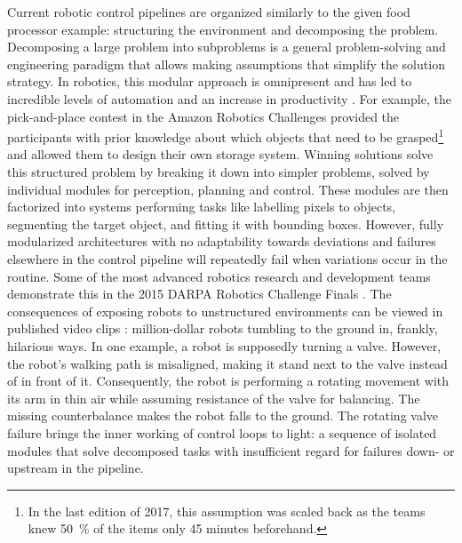 \documentclass[\home/main.tex]{subfiles}
\begin{document}
Current robotic control pipelines are organized similarly to the given food processor example: structuring the environment and decomposing the problem. Decomposing a large problem into subproblems is a general problem-solving and engineering paradigm that allows making assumptions that simplify the solution strategy.
In robotics, this modular approach is omnipresent and has led to incredible levels of automation and an increase in productivity \autocite{Graetz2018}. For example, the pick-and-place contest in the Amazon Robotics Challenges provided the participants with prior knowledge about which objects that need to be grasped\footnote{In the last edition of 2017, this assumption was scaled back as the teams knew \qty{50}{\percent} of the items only 45 minutes beforehand.} and allowed them to design their own storage system. Winning solutions \autocite{ijcai2017,morrison2018cartman} solve this structured problem by breaking it down into simpler problems, solved by individual modules for perception, planning and control. These modules are then factorized into systems performing tasks like labelling pixels to objects, segmenting the target object, and fitting it with bounding boxes.
However, fully modularized architectures with no adaptability towards deviations and failures elsewhere in the control pipeline will repeatedly fail when variations occur in the routine. Some of the most advanced robotics research and development teams demonstrate this in the 2015 DARPA Robotics Challenge Finals \autocite{DARPA2015}. The consequences of exposing robots to unstructured environments can be viewed in published video clips \autocite{darpaVideos}: million-dollar robots tumbling to the ground in, frankly, hilarious ways. In one example, a robot is supposedly turning a valve. However, the robot's walking path is misaligned, making it stand next to the valve instead of in front of it. Consequently, the robot is performing a rotating movement with its arm in thin air while assuming resistance of the valve for balancing. The missing counterbalance makes the robot falls to the ground. The rotating valve failure brings the inner working of control loops to light: a sequence of isolated modules that solve decomposed tasks with insufficient regard for failures down- or upstream in the pipeline.
\end{document}
